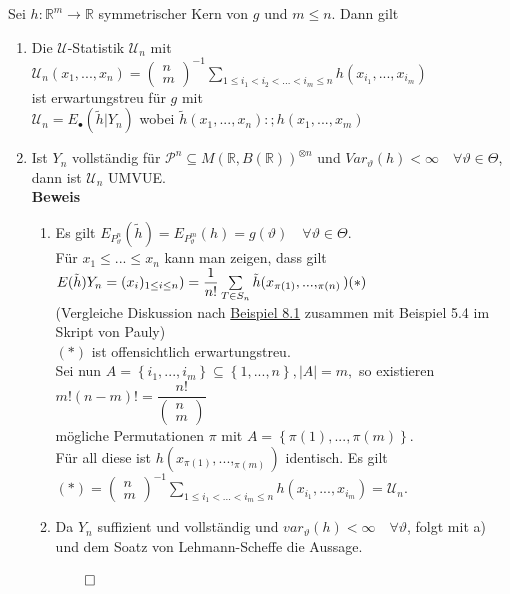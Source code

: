 \documentclass[german,10pt,oneside, fleqn, a4paper]{article}
\newcommand {\R}	{\mathbb{R}}
\newcommand{\ra}{\rightarrow}
\newcommand{\brac}[1]{\left\lbrace #1\right\rbrace}
\newcommand{\QED}{\begin{flushright}$\qed$\end{flushright}}
\newcommand{\mat}[1]{\begin{pmatrix}#1\end{pmatrix}}
\newcommand{\mc}[1]{\mathcal{#1}}
\newcommand{\beweis}{\textbf{Beweis}\\}
\newcommand{\1}[1]{1_{#1}}
\newcommand{\2}[1]{\1{\brac{#1}}}
\newcommand{\p}{\mc{P}}
\newcommand{\uu}{\mc{U}}
\newcommand{\qf}{\quad\forall}
\newcommand{\stuff}{{\otimes n}}
\begin{document}
Sei $h:\R^m\ra\R$ symmetrischer Kern von $g$ und $m\leq n$. Dann gilt\begin{enumerate}[label=(\alph*)]
\item Die $\uu$-Statistik $\uu_n$ mit \\
$\uu_n(x_1,...,x_n)=\mat{n\\m}^{-1}\sum\limits_{1\leq i_1<i_2<...<i_m\leq n}h(x_{i_1},...,x_{i_m})$\\
ist erwartungstreu für $g$ mit \\
$\uu_n=E_\bullet(\tilde h|Y_n)$ wobei $\tilde h(x_1,...,x_n):;h(x_1,...,x_m)$
\item Ist $Y_n$ vollständig für $\p^n\subseteq M(\R,B(\R))^\stuff$ und $Var_\vartheta(h)<\infty\qf\vartheta\in\Theta$, dann ist $\uu_n$ UMVUE.\\
\beweis
\begin{enumerate}[label=(\alph*)]
\item Es gilt $E_{P_\vartheta^n}(\tilde h)=E_{P_\vartheta^m}(h)=g(\vartheta)\qf\vartheta\in\Theta$. \\Für $x_1\leq...\leq x_n$ kann man zeigen, dass gilt\\
$E(\tilde h)Y_n=(x_i)_{1\leq i\leq n})=\dfrac{1}{n!}\sum\limits_{T\in S_n}\tilde h(x_{\pi(1)},...,_{\pi(n)})\hfill(*)$ \\(Vergleiche Diskussion nach \hyperref[8.1]{Beispiel 8.1} zusammen mit Beispiel 5.4 im Skript von Pauly)\\
$(*)$ ist offensichtlich erwartungstreu.\\
Sei nun $A=\brac{i_1,...,i_m}\subseteq\brac{1,...,n}, |A|=m,$ so existieren\\
$m!(n-m)!=\dfrac{n!}{\mat{n\\m}}$\\
mögliche Permutationen $\pi$ mit $A=\brac{\pi(1),...,\pi(m)}.$\\
Für all diese ist $h(x_{\pi(1)},...,_{\pi(m)})$ identisch. Es gilt\\
$(*)=\mat{n\\m}^{-1}\sum\limits_{1\leq i_1<...<i_m\leq n}h(x_{i_1},...,x_{i_m})=\uu_n.$
\item Da $Y_n$ suffizient und vollständig und $var_\vartheta(h)<\infty\qf\vartheta$, folgt mit a) und dem Soatz von Lehmann-Scheffe die Aussage.\QED


\end{enumerate}
\end{enumerate}
\end{document}
